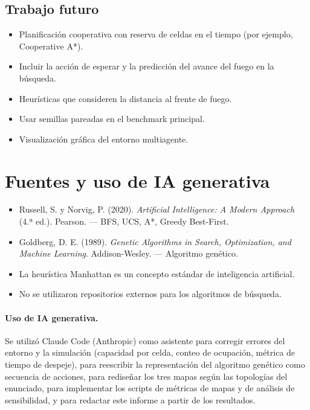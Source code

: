 \documentclass[11pt,a4paper]{article}
\begin{document}
\subsection{Trabajo futuro}

\begin{itemize}
  \item Planificación cooperativa con reserva de celdas en el tiempo (por ejemplo, Cooperative A*).
  \item Incluir la acción de esperar y la predicción del avance del fuego en la búsqueda.
  \item Heurísticas que consideren la distancia al frente de fuego.
  \item Usar semillas pareadas en el benchmark principal.
  \item Visualización gráfica del entorno multiagente.
\end{itemize}

\section{Fuentes y uso de IA generativa}

\begin{itemize}
  \item Russell, S. y Norvig, P. (2020). \emph{Artificial Intelligence: A Modern Approach} (4.ª ed.). Pearson. --- BFS, UCS, A*, Greedy Best-First.
  \item Goldberg, D. E. (1989). \emph{Genetic Algorithms in Search, Optimization, and Machine Learning}. Addison-Wesley. --- Algoritmo genético.
  \item La heurística Manhattan es un concepto estándar de inteligencia artificial.
  \item No se utilizaron repositorios externos para los algoritmos de búsqueda.
\end{itemize}

\paragraph{Uso de IA generativa.} Se utilizó Claude Code (Anthropic) como asistente para corregir errores del entorno y la simulación (capacidad por celda, conteo de ocupación, métrica de tiempo de despeje), para reescribir la representación del algoritmo genético como secuencia de acciones, para rediseñar los tres mapas según las topologías del enunciado, para implementar los scripts de métricas de mapas y de análisis de sensibilidad, y para redactar este informe a partir de los resultados.
\end{document}
